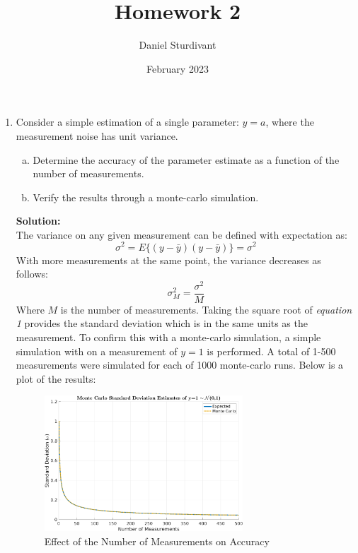 \documentclass[11pt]{article}
\author{Daniel Sturdivant}
\title{Homework 2}
\date{February 2023}
\newcommand{\solution}{\textbf{Solution: \\}}
\begin{document}
\maketitle
\thispagestyle{fancy}
\setlength{\parindent}{0pt}

\begin{enumerate}[label=\textbf{\arabic*.}]
  \itemsep 24pt
  \item Consider a simple estimation of a single parameter: $y=a$, where the 
  measurement noise has unit variance.
  \begin{enumerate}[(a)]
    \itemsep -2pt
    \item Determine the accuracy of the parameter estimate as a function of 
    the number of measurements.
    \item Verify the results through a monte-carlo simulation.
  \end{enumerate}
  \solution
  The variance on any given measurement can be defined with expectation as:
  \begin{equation*}
    \sigma^2 = E\{(y-\bar{y})(y-\bar{y})\} = \sigma^2
  \end{equation*}
  With more measurements at the same point, the variance decreases as follows:
  \begin{equation}
    \sigma_M^2 = \dfrac{\sigma^2}{M}
  \end{equation}
  Where $M$ is the number of measurements. Taking the square root of 
  \emph{equation 1} provides the standard deviation which is in the same units as 
  the measurement. To confirm this with a monte-carlo simulation, a simple 
  simulation with on a measurement of $y=1$ is performed. A total of 1-500 
  measurements were simulated for each of 1000 monte-carlo runs. Below is 
  a plot of the results:
  \begin{figure}[H]
    \centering
    \includegraphics[width=0.7\textwidth]{p1.png}
    \caption{Effect of the Number of Measurements on Accuracy}
  \end{figure}


\end{enumerate}
\end{document}
